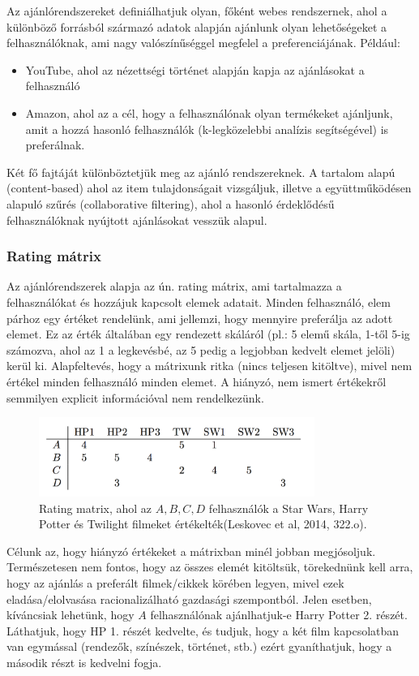 \documentclass[a4paper,12pt]{article}
\begin{document}
Az ajánlórendszereket definiálhatjuk olyan, főként webes rendszernek, ahol a különböző forrásból származó adatok alapján ajánlunk olyan lehetőségeket a felhasználóknak, ami nagy valószínűséggel megfelel a preferenciájának. Például:
\begin{itemize}
\item YouTube, ahol az nézettségi történet alapján kapja az ajánlásokat a felhasználó
\item Amazon, ahol az a cél, hogy a felhasználónak olyan termékeket ajánljunk, amit a hozzá hasonló felhasználók (k-legközelebbi analízis segítségével) is preferálnak.
\end{itemize}
Két fő fajtáját különböztetjük meg az ajánló rendszereknek. A tartalom alapú (content-based) ahol az item tulajdonságait vizsgáljuk, illetve a együttműködésen alapuló szűrés (collaborative filtering), ahol a hasonló érdeklődésű felhasználóknak nyújtott ajánlásokat vesszük alapul. \newline


\subsubsection{Rating mátrix}

Az ajánlórendszerek alapja az ún. rating mátrix, ami tartalmazza a felhasználókat és hozzájuk kapcsolt elemek adatait. Minden felhasználó, elem párhoz egy értéket rendelünk, ami jellemzi, hogy mennyire preferálja az adott elemet. Ez az érték általában egy rendezett skáláról (pl.: 5 elemű skála, 1-től 5-ig számozva, ahol az 1 a legkevésbé, az 5 pedig a legjobban kedvelt elemet jelöli) kerül ki. Alapfeltevés, hogy a mátrixunk ritka (nincs teljesen kitöltve), mivel nem értékel minden felhasználó minden elemet. A hiányzó, nem ismert értékekről semmilyen explicit információval nem rendelkezünk.

\begin{figure}[ht!]
\centering
\includegraphics[width=90mm]{img/um.png}
\caption{Rating matrix, ahol az $A,B, C, D$ felhasználók a Star Wars, Harry Potter és Twilight filmeket értékelték(Leskovec et al, 2014, 322.o). \label{um}}
\end{figure}

Célunk az, hogy hiányzó értékeket a mátrixban minél jobban megjósoljuk. Természetesen nem fontos, hogy az összes elemét kitöltsük, törekednünk kell arra, hogy az ajánlás a preferált filmek/cikkek körében legyen, mivel ezek eladása/elolvasása racionalizálható gazdasági szempontból. Jelen esetben, kíváncsiak lehetünk, hogy $A$ felhasználónak ajánlhatjuk-e Harry Potter 2. részét. Láthatjuk, hogy HP 1. részét kedvelte, és tudjuk, hogy a két film kapcsolatban van egymással (rendezők, színészek, történet, stb.) ezért gyaníthatjuk, hogy a második részt is kedvelni fogja.
\end{document}

